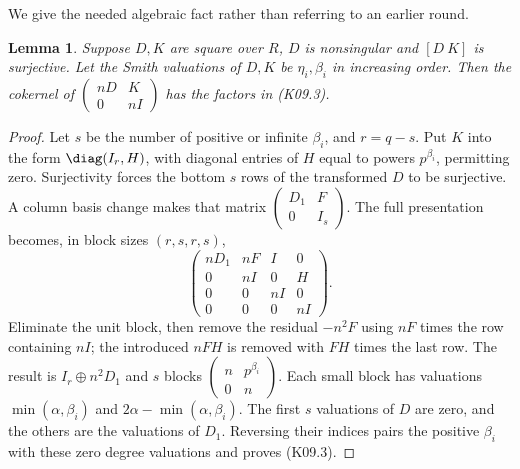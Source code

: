 \documentclass[11pt,a4paper]{article}
\newtheorem{lemma}[theorem]{Lemma}
\theoremstyle{definition}\newtheorem{definition}[theorem]{Definition}
\theoremstyle{remark}\newtheorem{remark}[theorem]{Remark}
\numberwithin{equation}{section}
\begin{document}
We give the needed algebraic fact rather than referring to an earlier round.
\begin{lemma}\label{K09-couple}
Suppose $D,K$ are square over $R$, $D$ is nonsingular and $[D\ K]$ is surjective. Let the Smith valuations of $D,K$ be $\eta_i,\beta_i$ in increasing order. Then the cokernel of $\left(\begin{smallmatrix}nD&K\\0&nI\end{smallmatrix}\right)$ has the factors in (K09.3).
\end{lemma}
\begin{proof}
Let $s$ be the number of positive or infinite $\beta_i$, and $r=q-s$. Put $K$ into the form $\diag(I_r,H)$, with diagonal entries of $H$ equal to powers $p^{\beta_i}$, permitting zero. Surjectivity forces the bottom $s$ rows of the transformed $D$ to be surjective. A column basis change makes that matrix
$\left(\begin{smallmatrix}D_1&F\\0&I_s\end{smallmatrix}\right)$.
The full presentation becomes, in block sizes $(r,s,r,s)$,
\[
 \begin{pmatrix}
 nD_1&nF&I&0\\0&nI&0&H\\0&0&nI&0\\0&0&0&nI
 \end{pmatrix}.
\]
Eliminate the unit block, then remove the residual $-n^2F$ using $nF$ times the row containing $nI$; the introduced $nFH$ is removed with $FH$ times the last row. The result is $I_r\oplus n^2D_1$ and $s$ blocks $\left(\begin{smallmatrix}n&p^{\beta_i}\\0&n\end{smallmatrix}\right)$. Each small block has valuations $\min(\alpha,\beta_i)$ and $2\alpha-\min(\alpha,\beta_i)$. The first $s$ valuations of $D$ are zero, and the others are the valuations of $D_1$. Reversing their indices pairs the positive $\beta_i$ with these zero degree valuations and proves (K09.3).
\end{proof}
\end{document}
